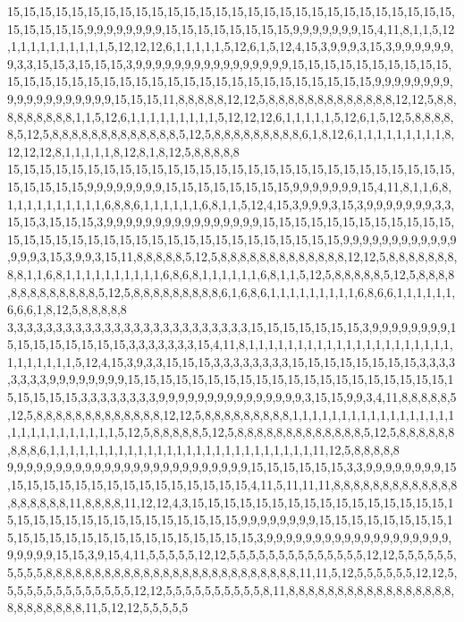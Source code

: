 15,15,15,15,15,15,15,15,15,15,15,15,15,15,15,15,15,15,15,15,15,15,15,15,15,15,15,15,15,15,15,15,15,9,9,9,9,9,9,9,9,15,15,15,15,15,15,15,15,9,9,9,9,9,9,9,15,4,11,8,1,1,5,12,1,1,1,1,1,1,1,1,1,1,5,12,12,12,6,1,1,1,1,1,5,12,6,1,5,12,4,15,3,9,9,9,3,15,3,9,9,9,9,9,9,9,3,3,15,15,3,15,15,15,3,9,9,9,9,9,9,9,9,9,9,9,9,9,9,9,9,15,15,15,15,15,15,15,15,15,15,15,15,15,15,15,15,15,15,15,15,15,15,15,15,15,15,15,15,15,15,15,15,15,9,9,9,9,9,9,9,9,9,9,9,9,9,9,9,9,9,9,9,15,15,15,11,8,8,8,8,8,12,12,5,8,8,8,8,8,8,8,8,8,8,8,8,8,12,12,5,8,8,8,8,8,8,8,8,8,1,1,5,12,6,1,1,1,1,1,1,1,1,1,5,12,12,12,6,1,1,1,1,1,5,12,6,1,5,12,5,8,8,8,8,8,5,12,5,8,8,8,8,8,8,8,8,8,8,8,8,8,5,12,5,8,8,8,8,8,8,8,8,8,6,1,8,12,6,1,1,1,1,1,1,1,1,1,8,12,12,12,8,1,1,1,1,1,8,12,8,1,8,12,5,8,8,8,8,8
15,15,15,15,15,15,15,15,15,15,15,15,15,15,15,15,15,15,15,15,15,15,15,15,15,15,15,15,15,15,15,15,15,9,9,9,9,9,9,9,9,15,15,15,15,15,15,15,15,9,9,9,9,9,9,9,15,4,11,8,1,1,6,8,1,1,1,1,1,1,1,1,1,1,6,8,8,6,1,1,1,1,1,1,6,8,1,1,5,12,4,15,3,9,9,9,3,15,3,9,9,9,9,9,9,9,3,3,15,15,3,15,15,15,3,9,9,9,9,9,9,9,9,9,9,9,9,9,9,9,9,15,15,15,15,15,15,15,15,15,15,15,15,15,15,15,15,15,15,15,15,15,15,15,15,15,15,15,15,15,15,15,15,15,9,9,9,9,9,9,9,9,9,9,9,9,9,9,9,3,15,3,9,9,3,15,11,8,8,8,8,8,5,12,5,8,8,8,8,8,8,8,8,8,8,8,8,8,12,12,5,8,8,8,8,8,8,8,8,8,1,1,6,8,1,1,1,1,1,1,1,1,1,1,6,8,6,8,1,1,1,1,1,1,6,8,1,1,5,12,5,8,8,8,8,8,5,12,5,8,8,8,8,8,8,8,8,8,8,8,8,8,5,12,5,8,8,8,8,8,8,8,8,8,6,1,6,8,6,1,1,1,1,1,1,1,1,1,6,8,6,6,1,1,1,1,1,1,6,6,6,1,8,12,5,8,8,8,8,8
3,3,3,3,3,3,3,3,3,3,3,3,3,3,3,3,3,3,3,3,3,3,3,3,3,15,15,15,15,15,15,15,3,9,9,9,9,9,9,9,9,15,15,15,15,15,15,15,15,3,3,3,3,3,3,3,15,4,11,8,1,1,1,1,1,1,1,1,1,1,1,1,1,1,1,1,1,1,1,1,1,1,1,1,1,1,1,1,5,12,4,15,3,9,3,3,15,15,15,3,3,3,3,3,3,3,3,15,15,15,15,15,15,15,15,3,3,3,3,3,3,3,3,9,9,9,9,9,9,9,9,15,15,15,15,15,15,15,15,15,15,15,15,15,15,15,15,15,15,15,15,15,15,15,15,15,3,3,3,3,3,3,3,3,9,9,9,9,9,9,9,9,9,9,9,9,9,9,9,3,15,15,9,9,3,4,11,8,8,8,8,8,5,12,5,8,8,8,8,8,8,8,8,8,8,8,8,8,12,12,5,8,8,8,8,8,8,8,8,8,1,1,1,1,1,1,1,1,1,1,1,1,1,1,1,1,1,1,1,1,1,1,1,1,1,1,1,1,5,12,5,8,8,8,8,8,5,12,5,8,8,8,8,8,8,8,8,8,8,8,8,8,5,12,5,8,8,8,8,8,8,8,8,8,6,1,1,1,1,1,1,1,1,1,1,1,1,1,1,1,1,1,1,1,1,1,1,1,1,1,1,1,11,12,5,8,8,8,8,8
9,9,9,9,9,9,9,9,9,9,9,9,9,9,9,9,9,9,9,9,9,9,9,9,9,15,15,15,15,15,15,3,3,9,9,9,9,9,9,9,9,15,15,15,15,15,15,15,15,15,15,15,15,15,15,15,15,4,11,5,11,11,11,8,8,8,8,8,8,8,8,8,8,8,8,8,8,8,8,8,8,8,11,8,8,8,8,11,12,12,4,3,15,15,15,15,15,15,15,15,15,15,15,15,15,15,15,15,15,15,15,15,15,15,15,15,15,15,15,15,15,15,15,9,9,9,9,9,9,9,9,15,15,15,15,15,15,15,15,15,15,15,15,15,15,15,15,15,15,15,15,15,15,15,15,3,9,9,9,9,9,9,9,9,9,9,9,9,9,9,9,9,9,9,9,9,9,9,9,9,15,15,3,9,15,4,11,5,5,5,5,5,12,12,5,5,5,5,5,5,5,5,5,5,5,5,5,5,12,12,5,5,5,5,5,5,5,5,5,5,8,8,8,8,8,8,8,8,8,8,8,8,8,8,8,8,8,8,8,8,8,8,8,8,8,8,11,11,5,12,5,5,5,5,5,5,12,12,5,5,5,5,5,5,5,5,5,5,5,5,5,5,12,12,5,5,5,5,5,5,5,5,5,5,8,11,8,8,8,8,8,8,8,8,8,8,8,8,8,8,8,8,8,8,8,8,8,8,8,8,8,11,5,12,12,5,5,5,5,5

